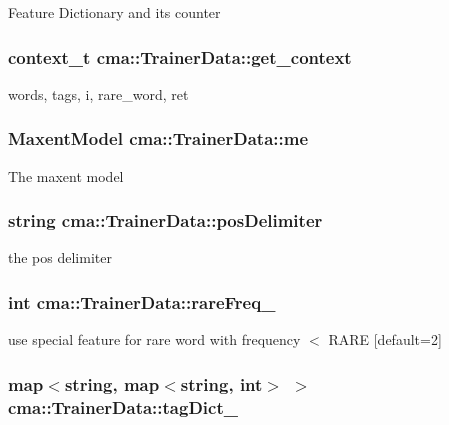 Feature Dictionary and its counter 
\subsubsection[{get\_\-context}]{\setlength{\rightskip}{0pt plus 5cm}context\_\-t {\bf cma::TrainerData::get\_\-context}}\label{classcma_1_1TrainerData_6a4496484d04a90c61f201011536d8c2}


words, tags, i, rare\_\-word, ret 
\subsubsection[{me}]{\setlength{\rightskip}{0pt plus 5cm}MaxentModel {\bf cma::TrainerData::me}}\label{classcma_1_1TrainerData_eebdd898115e74ed985c5b776bbb3074}


The maxent model 
\subsubsection[{posDelimiter}]{\setlength{\rightskip}{0pt plus 5cm}string {\bf cma::TrainerData::posDelimiter}}\label{classcma_1_1TrainerData_24b6c6f09b1ffe2c5228730901147224}


the pos delimiter 
\subsubsection[{rareFreq\_\-}]{\setlength{\rightskip}{0pt plus 5cm}int {\bf cma::TrainerData::rareFreq\_\-}}\label{classcma_1_1TrainerData_c13b7242d3736c2d40772d093fc91a18}


use special feature for rare word with frequency $<$ RARE [default=2] 
\subsubsection[{tagDict\_\-}]{\setlength{\rightskip}{0pt plus 5cm}map$<$string, map$<$string, int$>$ $>$ {\bf cma::TrainerData::tagDict\_\-}}\label{classcma_1_1TrainerData_9ecba8810e62c9a6bfb7446264654a28}


